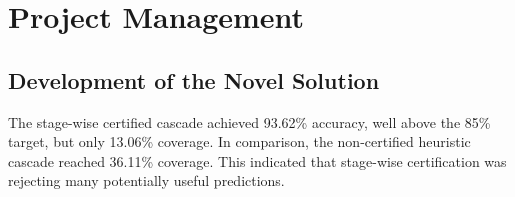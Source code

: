 \documentclass[11pt]{article}
\begin{document}


\section{Project Management}

\subsection{Development of the Novel Solution}

The stage-wise certified cascade achieved 93.62\% accuracy, well above the
85\% target, but only 13.06\% coverage. In comparison, the non-certified
heuristic cascade reached 36.11\% coverage. This indicated that stage-wise
certification was rejecting many potentially useful predictions.
\end{document}
